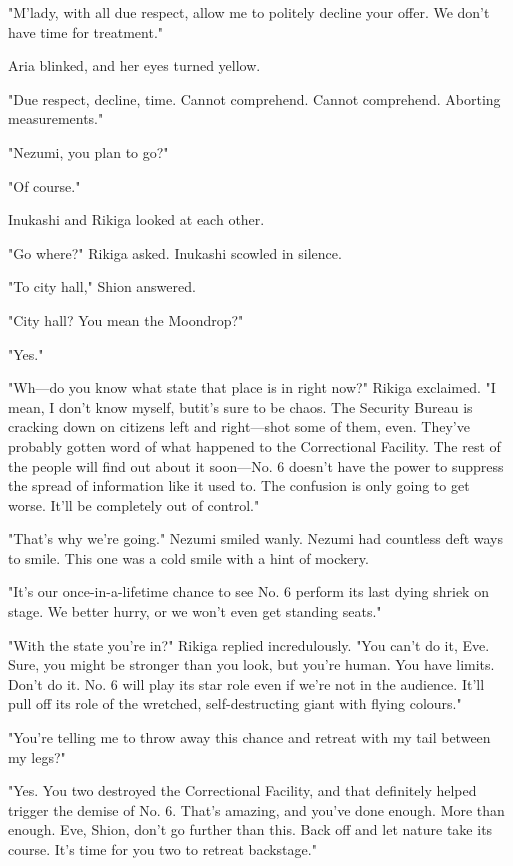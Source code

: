 "M'lady, with all due respect, allow me to politely decline your offer.
We don't have time for treatment."

Aria blinked, and her eyes turned yellow.

{\sffamily "Due respect, decline, time. Cannot comprehend. Cannot comprehend.
Aborting measurements."}

"Nezumi, you plan to go?"

"Of course."

Inukashi and Rikiga looked at each other.

"Go where?" Rikiga asked. Inukashi scowled in silence.

"To city hall," Shion answered.

"City hall? You mean the Moondrop?"

"Yes."

"Wh---do you know what state that place is in right now?" Rikiga
exclaimed. "I mean, I don't know myself, but\el it's sure to be chaos.
The Security Bureau is cracking down on citizens left and right---shot
some of them, even. They've probably gotten word of what happened to the
Correctional Facility. The rest of the people will find out about it
soon---No. 6 doesn't have the power to suppress the spread of information
like it used to. The confusion is only going to get worse. It'll be
completely out of control."

"That's why we're going." Nezumi smiled wanly. Nezumi had countless deft
ways to smile. This one was a cold smile with a hint of mockery.

"It's our once-in-a-lifetime chance to see No. 6 perform its last dying
shriek on stage. We better hurry, or we won't even get standing seats."

"With the state you're in?" Rikiga replied incredulously. "You can't do
it, Eve. Sure, you might be stronger than you look, but you're human.
You have limits. Don't do it. No. 6 will play its star role even if
we're not in the audience. It'll pull off its role of the wretched,
self-destructing giant with flying colours."

"You're telling me to throw away this chance and retreat with my tail
between my legs?"

"Yes. You two destroyed the Correctional Facility, and that definitely
helped trigger the demise of No. 6. That's amazing, and you've done
enough. More than enough. Eve, Shion, don't go further than this. Back
off and let nature take its course. It's time for you two to retreat
backstage."

